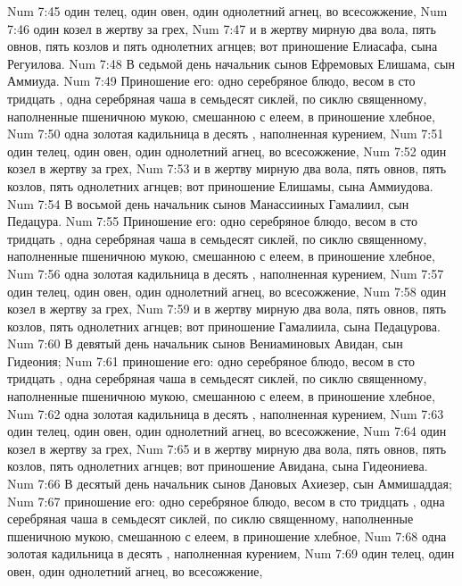 \vs Num 7:45 один телец, один овен, один однолетний агнец, во всесожжение,
\vs Num 7:46 один козел в жертву за грех,
\vs Num 7:47 и в жертву мирную два вола, пять овнов, пять козлов и пять однолетних агнцев; вот приношение Елиасафа, сына Регуилова.
\vs Num 7:48 В седьмой день начальник сынов Ефремовых Елишама, сын Аммиуда.
\vs Num 7:49 Приношение его: одно серебряное блюдо, весом в сто тридцать , одна серебряная чаша в семьдесят сиклей, по сиклю священному, наполненные пшеничною мукою, смешанною с елеем, в приношение хлебное,
\vs Num 7:50 одна золотая кадильница в десять , наполненная курением,
\vs Num 7:51 один телец, один овен, один однолетний агнец, во всесожжение,
\vs Num 7:52 один козел в жертву за грех,
\vs Num 7:53 и в жертву мирную два вола, пять овнов, пять козлов, пять однолетних агнцев; вот приношение Елишамы, сына Аммиудова.
\vs Num 7:54 В восьмой день начальник сынов Манассииных Гамалиил, сын Педацура.
\vs Num 7:55 Приношение его: одно серебряное блюдо, весом в сто тридцать , одна серебряная чаша в семьдесят сиклей, по сиклю священному, наполненные пшеничною мукою, смешанною с елеем, в приношение хлебное,
\vs Num 7:56 одна золотая кадильница в десять , наполненная курением,
\vs Num 7:57 один телец, один овен, один однолетний агнец, во всесожжение,
\vs Num 7:58 один козел в жертву за грех,
\vs Num 7:59 и в жертву мирную два вола, пять овнов, пять козлов, пять однолетних агнцев; вот приношение Гамалиила, сына Педацурова.
\vs Num 7:60 В девятый день начальник сынов Вениаминовых Авидан, сын Гидеония;
\vs Num 7:61 приношение его: одно серебряное блюдо, весом в сто тридцать , одна серебряная чаша в семьдесят сиклей, по сиклю священному, наполненные пшеничною мукою, смешанною с елеем, в приношение хлебное,
\vs Num 7:62 одна золотая кадильница в десять , наполненная курением,
\vs Num 7:63 один телец, один овен, один однолетний агнец, во всесожжение,
\vs Num 7:64 один козел в жертву за грех,
\vs Num 7:65 и в жертву мирную два вола, пять овнов, пять козлов, пять однолетних агнцев; вот приношение Авидана, сына Гидеониева.
\vs Num 7:66 В десятый день начальник сынов Дановых Ахиезер, сын Аммишаддая;
\vs Num 7:67 приношение его: одно серебряное блюдо, весом в сто тридцать , одна серебряная чаша в семьдесят сиклей, по сиклю священному, наполненные пшеничною мукою, смешанною с елеем, в приношение хлебное,
\vs Num 7:68 одна золотая кадильница в десять , наполненная курением,
\vs Num 7:69 один телец, один овен, один однолетний агнец, во всесожжение,
